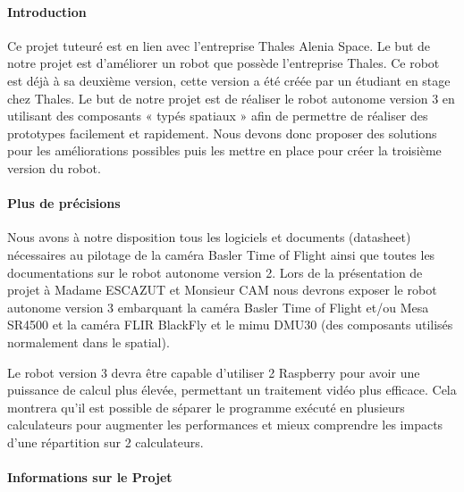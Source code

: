 \documentclass{PackagerQualityN}
\begin{document}

\newp       %
\setcounter{tocdepth}{2}
\tableofcontents
{}


\newp
{} %
\paragraph{Introduction}
Ce projet tuteuré est en lien avec l'entreprise Thales Alenia Space.
Le but de notre projet est d'améliorer un robot que possède l'entreprise Thales.
Ce robot est déjà à sa deuxième version, cette version a été créée par un étudiant en stage chez Thales.
Le but de notre projet est de réaliser le robot autonome version 3 en utilisant des composants « typés spatiaux » afin de permettre de réaliser des prototypes facilement et rapidement.
Nous devons donc proposer des solutions pour les améliorations possibles puis les mettre en place pour créer la troisième version du robot.


\paragraph{Plus de précisions}

Nous avons à notre disposition tous les logiciels et documents (datasheet) nécessaires au pilotage de la caméra Basler Time of Flight ainsi que toutes les documentations sur le robot autonome version 2. Lors de la présentation de projet à Madame ESCAZUT et Monsieur CAM nous devrons exposer le robot autonome version 3 embarquant la caméra Basler Time of Flight et/ou Mesa SR4500 et la caméra FLIR BlackFly et le mimu DMU30 (des composants utilisés normalement dans le spatial).


Le robot version 3 devra être capable d'utiliser 2 Raspberry pour avoir une puissance de calcul plus élevée, permettant un traitement vidéo plus efficace. Cela montrera qu'il est possible de séparer le programme exécuté en plusieurs calculateurs pour augmenter les performances et mieux comprendre les impacts d’une répartition sur 2 calculateurs.



\paragraph{Informations sur le Projet}
\end{document}
